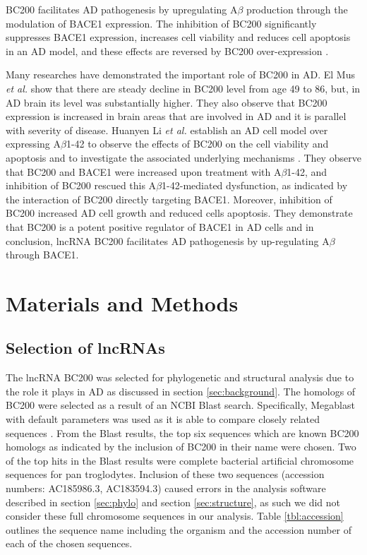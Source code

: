 \documentclass[conference, 11pt]{IEEEtran}
\begin{document}
BC200 facilitates AD pathogenesis by upregulating A$\beta$ production through the modulation of BACE1 expression. 
The inhibition of BC200 significantly suppresses BACE1 expression, increases cell viability and reduces cell apoptosis in an AD model, and these effects are reversed by BC200 over-expression \cite{li2018identification,zhang2021role}.

Many researches have demonstrated the important role of BC200 in AD. 
El Mus \emph{et al.} show that there are steady decline in BC200 level from age 49 to 86, but, in AD brain its level was substantially higher\cite{mus2007dendritic}. 
They also observe that BC200 expression is increased in brain areas that are involved in AD and it is parallel with severity of disease. 
Huanyen Li \emph{et al.} establish an AD cell model over expressing A$\beta$1-42 to observe the effects of BC200 on the cell viability and apoptosis and to investigate the associated underlying mechanisms\cite{li2018identification} . 
They observe that BC200 and BACE1 were increased upon treatment with A$\beta$1-42, and inhibition of BC200 rescued this A$\beta$1-42-mediated dysfunction, as indicated by the interaction of BC200 directly targeting BACE1. 
Moreover, inhibition of BC200 increased AD cell growth and reduced cells apoptosis. 
They demonstrate that BC200 is a potent positive regulator of BACE1 in AD cells and in conclusion, lncRNA BC200 facilitates AD pathogenesis by up-regulating A$\beta$ through BACE1.  					 			 		 	 

\section{Materials and Methods}\label{sec:methods}

\subsection{Selection of lncRNAs}\label{sec:lncRNA-selection}
The lncRNA BC200 was selected for phylogenetic and structural analysis due to the role it plays in AD as discussed in section \ref{sec:background}. 
The homologs of BC200 were selected as a result of an NCBI Blast \cite{blastTool} search. 
Specifically, Megablast \cite{morgulis2008database} with default parameters was used as it is able to compare closely related sequences \cite{amirmahani2018phylogenetic}. 
From the Blast results, the top six sequences which are known BC200 homologs as indicated by the inclusion of BC200 in their name were chosen. 
Two of the top hits in the Blast results were complete bacterial artificial chromosome sequences for pan troglodytes. 
Inclusion of these two sequences (accession numbers: AC185986.3, AC183594.3) caused errors in the analysis software described in section \ref{sec:phylo} and section \ref{sec:structure}, as such we did not consider these full chromosome sequences in our analysis. 
Table \ref{tbl:accession} outlines the sequence name including the organism and the accession number of each of the chosen sequences. 
\end{document}
